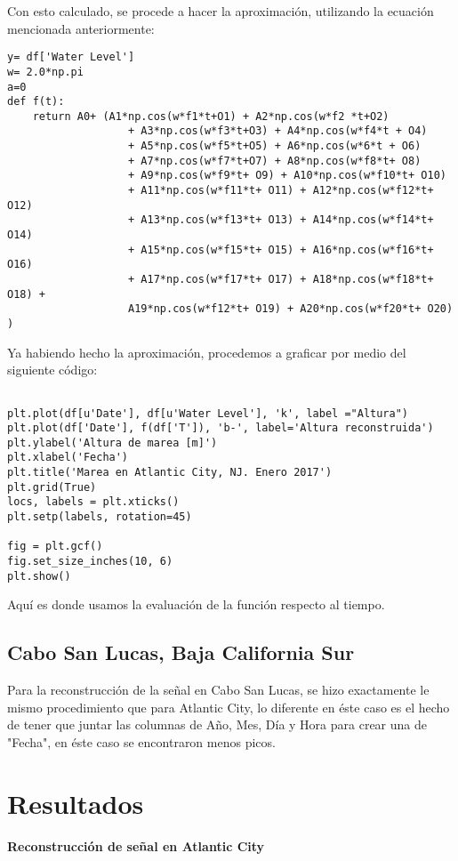 \documentclass[12pt]{article}
\begin{document}
\begin{doublespace}
Con esto calculado, se procede a hacer la aproximación, utilizando la ecuación mencionada anteriormente:

\begin{verbatim}
y= df['Water Level']
w= 2.0*np.pi
a=0
def f(t):
    return A0+ (A1*np.cos(w*f1*t+O1) + A2*np.cos(w*f2 *t+O2) 
                   + A3*np.cos(w*f3*t+O3) + A4*np.cos(w*f4*t + O4)
                   + A5*np.cos(w*f5*t+O5) + A6*np.cos(w*6*t + O6)
                   + A7*np.cos(w*f7*t+O7) + A8*np.cos(w*f8*t+ O8)
                   + A9*np.cos(w*f9*t+ O9) + A10*np.cos(w*f10*t+ O10) 
                   + A11*np.cos(w*f11*t+ O11) + A12*np.cos(w*f12*t+ O12) 
                   + A13*np.cos(w*f13*t+ O13) + A14*np.cos(w*f14*t+ O14) 
                   + A15*np.cos(w*f15*t+ O15) + A16*np.cos(w*f16*t+ O16)
                   + A17*np.cos(w*f17*t+ O17) + A18*np.cos(w*f18*t+ O18) + 
                   A19*np.cos(w*f12*t+ O19) + A20*np.cos(w*f20*t+ O20) )
\end{verbatim}

Ya habiendo hecho la aproximación, procedemos a graficar por medio del siguiente código:

\begin{verbatim}

plt.plot(df[u'Date'], df[u'Water Level'], 'k', label ="Altura")
plt.plot(df['Date'], f(df['T']), 'b-', label='Altura reconstruida')
plt.ylabel('Altura de marea [m]')
plt.xlabel('Fecha')
plt.title('Marea en Atlantic City, NJ. Enero 2017')
plt.grid(True)
locs, labels = plt.xticks()
plt.setp(labels, rotation=45)

fig = plt.gcf()
fig.set_size_inches(10, 6)
plt.show()
\end{verbatim}

Aquí es donde usamos la evaluación de la función respecto al tiempo.

\subsection{Cabo San Lucas, Baja California Sur}

Para la reconstrucción de la señal en Cabo San Lucas, se hizo exactamente le mismo procedimiento que para Atlantic City, lo diferente en éste caso es el hecho de tener que juntar las columnas de Año, Mes, Día y Hora para crear una de "Fecha", en éste caso se encontraron menos picos.

\pagebreak
\section{Resultados}
\textbf{Reconstrucción de señal en Atlantic City}


\end{doublespace}
\end{document}
